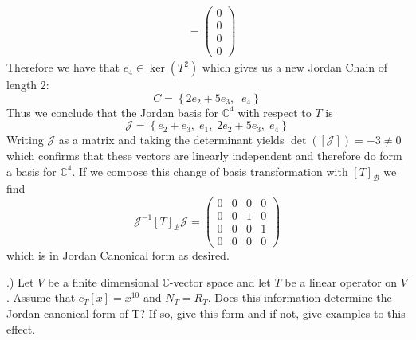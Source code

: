 \documentclass[a4paper, 11pt]{article}
\newcommand{\C}{\mathbb{C}}
\newenvironment{solution}{%
	\begin{list}{}{%
			\setlength{\topsep}{0pt}%
			\setlength{\leftmargin}{1.5cm}%
			\setlength{\rightmargin}{1.5cm}%
			\setlength{\listparindent}{\parindent}%
			\setlength{\itemindent}{\parindent}%
			\setlength{\parsep}{\parskip}%
		}%
		\item[]}{\end{list}}
\begin{document}
\begin{solution}
\begin{align*}
          &=\begin{pmatrix}0\\0\\0\\0\end{pmatrix}
  \end{align*}
  Therefore we have that $e_4\in\ker(T^2)$ which gives us a new Jordan Chain of length 2:
  \begin{equation*}
    C = \left\{ 2e_2+5e_3,\;\; e_4\right\}
  \end{equation*}
  Thus we conclude that the Jordan basis for $\C^4$ with respect to $T$ is
  \begin{equation*}
    \mathcal{J} = \left\{ e_2+e_3,\; e_1,\; 2e_2+5e_3,\; e_4\right\}
  \end{equation*}
  Writing $\mathcal{J}$ as a matrix and taking the determinant yields $\det([\mathcal{J}]) = -3 \neq 0$ which confirms that these vectors are linearly independent and therefore do form a basis for $\C^4$. If we compose this change of basis transformation with $[T]_\mathcal{B}$ we find
  \begin{equation*}
    \mathcal{J}^{-1}[T]_\mathcal{B}\mathcal{J} = \begin{pmatrix}
      0 & 0 & 0 & 0 \\
      0 & 0 & 1 & 0 \\
      0 & 0 & 0 & 1 \\
      0 & 0 & 0 & 0
      \end{pmatrix}
  \end{equation*}
 which is in Jordan Canonical form as desired. \\
\end{solution}

.) Let $V$ be a finite dimensional $\C$-vector space and let $T$ be a linear operator on $V$. Assume that $c_T[x]=x^{10}$ and $N_T = R_T$. Does this information determine the Jordan canonical form of T? If so, give this form and if not, give examples to this effect.\\
\end{document}
